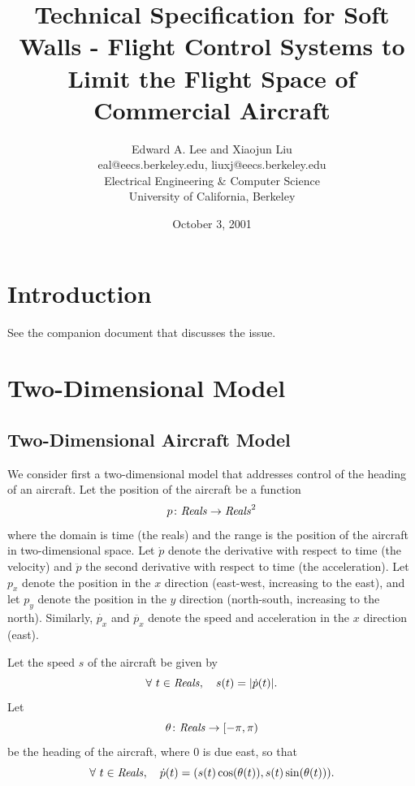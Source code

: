 \documentclass[11pt]{article}
\begin{document}


\title{Technical Specification for Soft Walls -
Flight Control Systems to Limit the Flight Space of Commercial Aircraft}
\author{Edward A. Lee and Xiaojun Liu\\
eal@eecs.berkeley.edu, liuxj@eecs.berkeley.edu\\
Electrical Engineering \& Computer Science\\
University of California, Berkeley}
\date{October 3, 2001}

\maketitle

\section{Introduction}

See the companion document that discusses the issue.

\section{Two-Dimensional Model}

\subsection{Two-Dimensional Aircraft Model}

We consider first a two-dimensional model that addresses
control of the heading of an aircraft.
Let the position of the aircraft be a function
\[
p \colon \mbox{\textit{Reals}} \to \mbox{\textit{Reals}} ^2
\]
where the domain is
time (the reals) and the range is the position of the aircraft
in two-dimensional space.
Let $\dot{p}$ denote the derivative with respect to time (the
velocity) and $\ddot{p}$ the second derivative with respect to time (the
acceleration). Let $p_x$ denote the position in the $x$ direction (east-west,
increasing to the east), and let $p_y$ denote the position in the $y$ direction
(north-south, increasing to the north). Similarly, $\dot{p_x}$ and $\ddot{p_x}$
denote the speed and acceleration in the $x$ direction (east).

Let the speed $s$ of the aircraft be given by
\[
\forall ~ t \in \mbox{\textit{Reals}}, \quad
s(t) = |\dot{p}(t)| .
\]
Let
\[
\theta \colon \mbox{\textit{Reals}} \to [-\pi, \pi)
\]
be the heading of the aircraft, where 0 is due east, so that
\[
\forall ~ t \in \mbox{\textit{Reals}}, \quad
\dot{p} (t) = (s(t) \cos(\theta (t)), s(t) \sin(\theta(t))) .
\]
\end{document}
